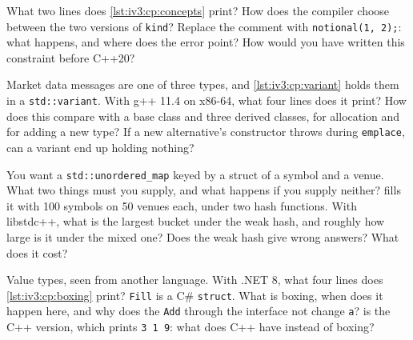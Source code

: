 \begin{question}\label{iq:iv3:cpp:37}
What two lines does \cref{lst:iv3:cp:concepts} print? How does the compiler choose between the two versions of \texttt{kind}? Replace the comment with \texttt{notional(1, 2);}: what happens, and where does the error point? How would you have written this constraint before C++20?
\label{lst:iv3:cp:concepts}
\end{question}

\begin{question}\label{iq:iv3:cpp:38}
Market data messages are one of three types, and \cref{lst:iv3:cp:variant} holds them in a \texttt{std::variant}. With g++ 11.4 on x86-64, what four lines does it print? How does this compare with a base class and three derived classes, for allocation and for adding a new type? If a new alternative's constructor throws during \texttt{emplace}, can a variant end up holding nothing?
\label{lst:iv3:cp:variant}
\end{question}

\begin{question}\label{iq:iv3:cpp:39}
You want a \texttt{std::unordered\_map} keyed by a struct of a symbol and a venue. What two things must you supply, and what happens if you supply neither?  fills it with 100 symbols on 50 venues each, under two hash functions. With libstdc++, what is the largest bucket under the weak hash, and roughly how large is it under the mixed one? Does the weak hash give wrong answers? What does it cost?
\label{lst:iv3:cp:keyhash}
\end{question}

\begin{question}\label{iq:iv3:cpp:40}
Value types, seen from another language. With .NET 8, what four lines does \cref{lst:iv3:cp:boxing} print? \texttt{Fill} is a C\# \texttt{struct}. What is boxing, when does it happen here, and why does the \texttt{Add} through the interface not change \texttt{a}?  is the C++ version, which prints \texttt{3 1 9}: what does C++ have instead of boxing?
\label{lst:iv3:cp:boxing}
\label{lst:iv3:cp:valuecpp}
\end{question}


